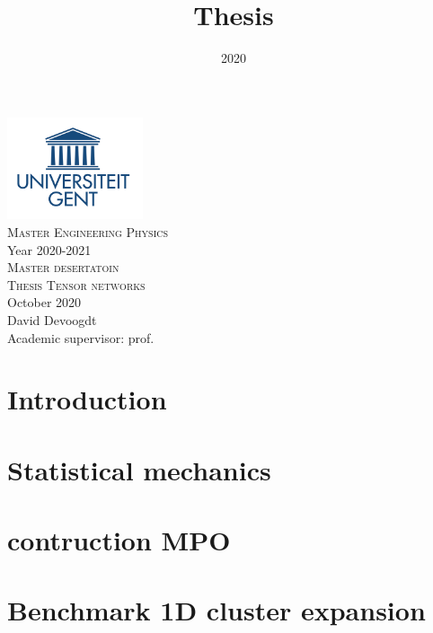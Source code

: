 \documentclass{article}
\title{Thesis}
\date{2020}
\begin{document}



\onecolumn
\begin{titlepage}
	\begin{center}	
		
		\includegraphics[width=4cm]{Figuren/UGent.png} \\[0.5cm]    %
		
		\Large{\textsc{Master Engineering Physics}} \\[0.5cm]  %
		
		\normalsize{Year 2020-2021} \\[3cm]  %
		
		\huge{\textsc{Master desertatoin}} \\[0.25cm]   %
		
		\Large{\textsc{Thesis Tensor networks}}\\[0.25cm]
		
		\large \textnormal{October 2020} \\[2.5cm]   %
		
		
       David Devoogdt \\       [2.5cm]

		 
        Academic supervisor: prof. 
         

		
		
		\vfill		
		
	\end{center}
\end{titlepage}

\tableofcontents

\newpage
\listoftodos
\newpage

{}



\section{Introduction}


\section{Statistical mechanics}


\section{contruction MPO}


\section{Benchmark 1D cluster expansion}


 

\end{document}

